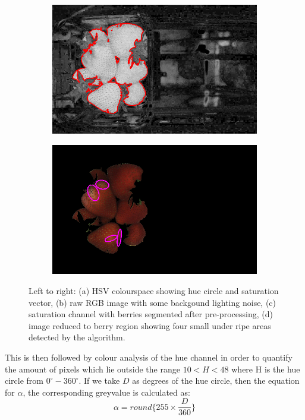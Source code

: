 \documentclass[fleqn,twoside]{article}
\begin{document}
\begin{figure}[ht]
	\begin{subfigure}{.4\textwidth}
		\centering
		\includegraphics[width=.9\linewidth]{sat_thresh.png}
		\caption{}
		\label{fig:sat_thresh}
	\end{subfigure}%
	\begin{subfigure}{.4\textwidth}
		\centering
		\includegraphics[width=.9\linewidth]{hue_processed.png}
		\caption{}
		\label{fig:hue_processed}
	\end{subfigure}%

	\caption{Left to right: (a) HSV colourspace showing hue circle and saturation vector, (b) raw RGB image with some backgound lighting noise, (c) saturation channel with berries segmented after pre-processing, (d) image reduced to berry region showing four small under ripe areas detected by the algorithm.}
	\label{}
\end{figure}


This is then followed by colour analysis of the hue channel in order to quantify the amount of pixels which lie outside the range $10<H<48$ where H is the hue circle from $0^{\circ}-360^{\circ}$. If we take $D$ as degrees of the hue circle, then the equation for $\alpha$, the corresponding greyvalue is calculated as:
\begin{equation}
\alpha = round\Big\{255\times \frac{D}{360}\Big\}
\end{equation}
\end{document}
